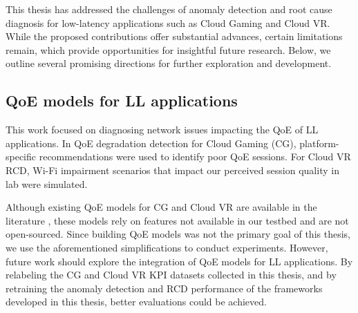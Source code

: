 












This thesis has addressed the challenges of anomaly detection and root cause diagnosis for low-latency applications such as Cloud Gaming and Cloud VR. While the proposed contributions offer substantial advances, certain limitations remain, which provide opportunities for insightful future research. Below, we outline several promising directions for further exploration and development.


\subsection*{QoE models for LL applications}
This work focused on diagnosing network issues impacting the QoE of LL applications. In QoE degradation detection for Cloud Gaming (CG), platform-specific recommendations were used to identify poor QoE sessions. For Cloud VR RCD, Wi-Fi impairment scenarios that impact our perceived session quality in lab were simulated.

Although existing QoE models for CG and Cloud VR are available in the literature \cite{lee2023modeling, huang2023practical, islam2023predicting}, these models rely on features not available in our testbed and are not open-sourced. Since building QoE models was not the primary goal of this thesis, we use the aforementioned simplifications to conduct experiments. However, future work should explore the integration of QoE models for LL applications. By relabeling the CG and Cloud VR KPI datasets collected in this thesis, and by retraining the anomaly detection and RCD performance of the frameworks developed in this thesis, better evaluations could be achieved.

